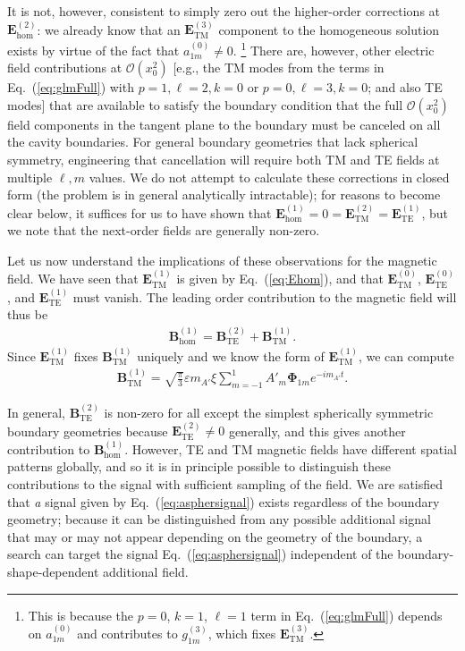 \documentclass[amsmath,amssymb,aps,10pt,prd,letterpaper,nofootinbib,balancelastpage,notitlepage,superscriptaddress,twocolumn,floatfix]{revtex4-2}
\renewcommand{\eqref}[2][]{Eq{#1}.~(\ref{eq:#2})}	%
\begin{document}
It is not, however, consistent to simply zero out the higher-order corrections at $\bm{E}_{\text{hom}}^{(2)}$: we already know that an $\bm{E}_{\text{TM}}^{(3)}$ component to the homogeneous solution exists by virtue of the fact that $a_{1 m}^{(0)} \neq 0$.%
\footnote{\label{ftnt:detail}%
    This is because the $p=0$, $k=1$, $\ell=1$ term in \eqref{glmFull} depends on $a_{1 m}^{(0)}$ and contributes to $g_{1 m}^{(3)}$, which fixes $\bm{E}_{\text{TM}}^{(3)}$.
} %
There are, however, other electric field contributions at $\mathcal{O}(x_0^2)$ [e.g., the TM modes from the terms in \eqref{glmFull} with $p=1,\ell=2,k=0$ or $p=0,\ell=3,k=0$; and also TE modes] that are available to satisfy the boundary condition that the full $\mathcal{O}(x_0^2)$ field components in the tangent plane to the boundary must be canceled on all the cavity boundaries.
For general boundary geometries that lack spherical symmetry, engineering that cancellation will require both TM and TE fields at multiple $\ell,m$ values.
We do not attempt to calculate these corrections in closed form (the problem is in general analytically intractable); for reasons to become clear below, it suffices for us to have shown that $\bm{E}_{\text{hom}}^{(1)} = 0 = \bm{E}_{\text{TM}}^{(2)} = \bm{E}_{\text{TE}}^{(1)}$, but we note that the next-order fields are generally non-zero.

Let us now understand the implications of these observations for the magnetic field.
We have seen that $\bm E_\text{TM}^{(1)}$ is given by \eqref{Ehom}, and that $\bm{E}_{\text{TM}}^{(0)}$, $\bm E_\text{TE}^{(0)}$, and $\bm E_\text{TE}^{(1)}$ must vanish.
The leading order contribution to the magnetic field will thus be
\begin{align}
    \bm B_\text{hom}^{(1)}=\bm B_\text{TE}^{(2)}+\bm B_\text{TM}^{(1)}.
\end{align}
Since $\bm{E}_{\text{TM}}^{(1)}$ fixes $\bm{B}_{\text{TM}}^{(1)}$ uniquely and we know the form of $\bm{E}_{\text{TM}}^{(1)}$, we can compute
\begin{align}\label{eq:asphersignal}
    \bm B_\text{TM}^{(1)}=\sqrt{\frac\pi3}\varepsilon m_{A'}\xi\sum_{m=-1}^1A'_m\bm\Phi_{1m}e^{-im_{A'}t}.
\end{align}

In general, $\bm B_\text{TE}^{(2)}$ is non-zero for all except the simplest spherically symmetric boundary geometries because $\bm{E}_{\text{TE}}^{(2)}\neq0$ generally, and this gives another contribution to $\bm B_\text{hom}^{(1)}$.
However, TE and TM magnetic fields have different spatial patterns globally, and so it is in principle possible to distinguish these contributions to the signal with sufficient sampling of the field.
We are satisfied that \emph{a} signal given by \eqref{asphersignal} exists regardless of the boundary geometry; because it can be distinguished from any possible additional signal that may or may not appear depending on the geometry of the boundary, a search can target the signal \eqref{asphersignal} independent of the boundary-shape-dependent additional field.
\end{document}
